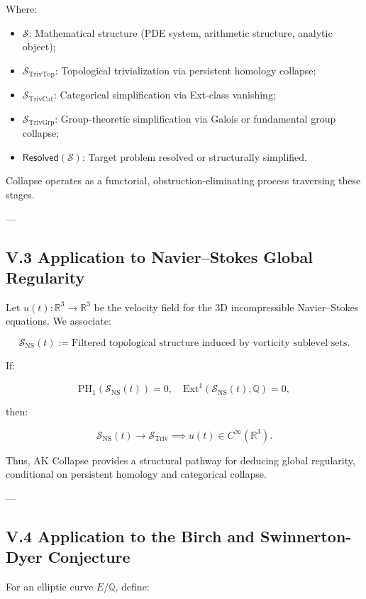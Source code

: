 \documentclass[11pt]{article}
\begin{document}
Where:
\begin{itemize}
    \item $\mathcal{S}$: Mathematical structure (PDE system, arithmetic structure, analytic object);
    \item $\mathcal{S}_{\mathrm{TrivTop}}$: Topological trivialization via persistent homology collapse;
    \item $\mathcal{S}_{\mathrm{TrivCat}}$: Categorical simplification via Ext-class vanishing;
    \item $\mathcal{S}_{\mathrm{TrivGrp}}$: Group-theoretic simplification via Galois or fundamental group collapse;
    \item $\mathsf{Resolved}(\mathcal{S})$: Target problem resolved or structurally simplified.
\end{itemize}

Collapse operates as a functorial, obstruction-eliminating process traversing these stages.

---

\subsection*{V.3 Application to Navier–Stokes Global Regularity}

Let $u(t) : \mathbb{R}^3 \to \mathbb{R}^3$ be the velocity field for the 3D incompressible Navier–Stokes equations.  
We associate:

\[
\mathcal{S}_{\mathrm{NS}}(t) := \text{Filtered topological structure induced by vorticity sublevel sets.}
\]

If:

\[
\mathrm{PH}_1(\mathcal{S}_{\mathrm{NS}}(t)) = 0, \quad \mathrm{Ext}^1(\mathcal{S}_{\mathrm{NS}}(t), \mathbb{Q}) = 0,
\]

then:

\[
\mathcal{S}_{\mathrm{NS}}(t) \longrightarrow \mathcal{S}_{\mathrm{Triv}} \implies u(t) \in C^\infty(\mathbb{R}^3).
\]

Thus, AK Collapse provides a structural pathway for deducing global regularity, conditional on persistent homology and categorical collapse.

---

\subsection*{V.4 Application to the Birch and Swinnerton-Dyer Conjecture}

For an elliptic curve $E/\mathbb{Q}$, define:
\end{document}
